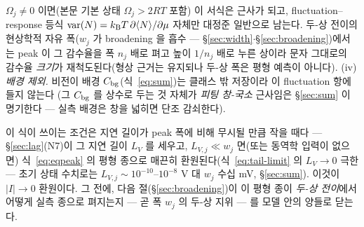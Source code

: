 \begin{bgbox}
\begin{verifybox}
$\Omega_j\neq0$ 이면(본문 기본 상태 $\Omega_j>2RT$ 포함) 이 서식은 근사가 되고, fluctuation--response 등식
$\mathrm{var}(N)=k_{\mathrm B} T\,\partial\langle N\rangle/\partial\mu$ 자체만 대정준 일반으로 남는다. 두-상 전이의
현상학적 자유 폭($w_j$ 가 broadening 을 흡수 --- \S\ref{sec:width}$\cdot$\S\ref{sec:broadening})에서는
peak 이 그 감수율을 폭 $n_j$ 배로 펴고 높이 $1/n_j$ 배로 누른 상이라 문자 그대로의 감수율 \emph{크기}가
재척도된다(형상 근거는 유지되나 두-상 폭은 평형 예측이 아니다). (iv)
\emph{배경 제외.} 비전이 배경 $C_{\mathrm{bg}}$(식~\eqref{eq:sum})는 클래스 밖 저장이라 이 fluctuation 항에 들지 않는다
(그 $C_{\mathrm{bg}}$ 를 상수로 두는 것 자체가 \emph{피팅 창-국소} 근사임은 \S\ref{sec:sum} 이 명기한다 --- 실측 배경은
창을 넓히면 단조 감쇠한다).
\end{verifybox}
\end{bgbox}


이 식이 쓰이는 조건은 지연 길이가 peak 폭에 비해 무시될 만큼 작을 때다 --- \S\ref{sec:lag}(N7)이 그 지연
길이 $L_V$ 를 세우고, $L_{V,j}\ll w_j$ 면(또는 동역학 입력이 없으면) 식~\eqref{eq:eqpeak} 의 평형 종으로
매끈히 환원된다(식~\eqref{eq:tail-limit} 의 $L_V\to0$ 극한 --- 초기 상태 수치로는 $L_{V,j}\sim10^{-10}$--$10^{-8}$ V
대 $w_j$ 수십 mV, \S\ref{sec:sum}). 이것이 $|I|\to0$ 환원이다.
그 전에, 다음 절(\S\ref{sec:broadening})이 이 평형 종이 \emph{두-상 전이}에서 어떻게 실측 종으로 펴지는지 ---
곧 폭 $w_j$ 의 두-상 지위 --- 를 모델 안의 양들로 닫는다.


